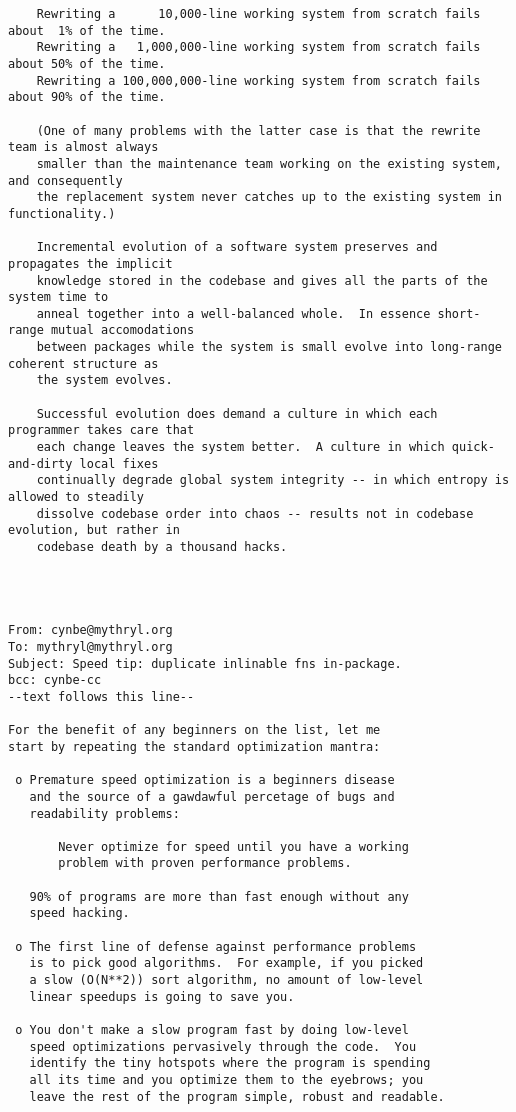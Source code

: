 \begin{verbatim}
    Rewriting a      10,000-line working system from scratch fails about  1% of the time.
    Rewriting a   1,000,000-line working system from scratch fails about 50% of the time.
    Rewriting a 100,000,000-line working system from scratch fails about 90% of the time.

    (One of many problems with the latter case is that the rewrite team is almost always
    smaller than the maintenance team working on the existing system, and consequently
    the replacement system never catches up to the existing system in functionality.)

    Incremental evolution of a software system preserves and propagates the implicit
    knowledge stored in the codebase and gives all the parts of the system time to
    anneal together into a well-balanced whole.  In essence short-range mutual accomodations
    between packages while the system is small evolve into long-range coherent structure as
    the system evolves.

    Successful evolution does demand a culture in which each programmer takes care that
    each change leaves the system better.  A culture in which quick-and-dirty local fixes
    continually degrade global system integrity -- in which entropy is allowed to steadily
    dissolve codebase order into chaos -- results not in codebase evolution, but rather in
    codebase death by a thousand hacks.




From: cynbe@mythryl.org
To: mythryl@mythryl.org
Subject: Speed tip: duplicate inlinable fns in-package.
bcc: cynbe-cc
--text follows this line--

For the benefit of any beginners on the list, let me
start by repeating the standard optimization mantra:

 o Premature speed optimization is a beginners disease
   and the source of a gawdawful percetage of bugs and
   readability problems:

       Never optimize for speed until you have a working
       problem with proven performance problems.

   90% of programs are more than fast enough without any
   speed hacking.

 o The first line of defense against performance problems
   is to pick good algorithms.  For example, if you picked
   a slow (O(N**2)) sort algorithm, no amount of low-level
   linear speedups is going to save you.

 o You don't make a slow program fast by doing low-level
   speed optimizations pervasively through the code.  You
   identify the tiny hotspots where the program is spending
   all its time and you optimize them to the eyebrows; you
   leave the rest of the program simple, robust and readable.



\end{verbatim}
